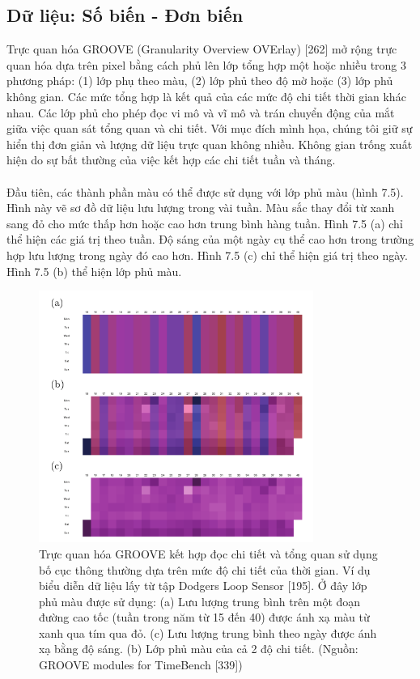 \subsection{Dữ liệu: Số biến - Đơn biến}
Trực quan hóa GROOVE (Granularity Overview OVErlay) [262] mở rộng trực quan hóa dựa trên pixel bằng cách phủ lên lớp tổng hợp một hoặc nhiều trong 3 phương pháp: (1) lớp phụ theo màu, (2) lớp phủ theo độ mờ hoặc (3) lớp phủ không gian. Các mức tổng hợp là kết quả của các mức độ chi tiết thời gian khác nhau. Các lớp phủ cho phép đọc vi mô và vĩ mô và trán chuyển động của mắt giữa việc quan sát tổng quan và chi tiết. Với mục đích mình họa, chúng tôi giữ sự hiển thị đơn giản và lượng dữ liệu trực quan không nhiều. Không gian trống xuất hiện do sự bất thường của việc kết hợp các chi tiết tuần và tháng. 
\\ \\
Đầu tiên, các thành phần màu có thể được sử dụng với lớp phủ màu (hình 7.5). Hình này vẽ sơ đồ dữ liệu lưu lượng trong vài tuần. Màu sắc thay đổi từ xanh sang đỏ cho mức thấp hơn hoặc cao hơn trung bình hàng tuần. Hình 7.5 (a) chỉ thể hiện các giá trị theo tuần. Độ sáng của một ngày cụ thể cao hơn trong trường hợp lưu lượng trong ngày đó cao hơn. Hình 7.5 (c) chỉ thể hiện giá trị theo ngày. Hình 7.5 (b) thể hiện lớp phủ màu.
\begin{figure}[H] %
    \centering %
    \includegraphics[width=0.8\textwidth]{assets/fig_7_5.png} 
    \caption{Trực quan hóa GROOVE kết hợp đọc chi tiết và tổng quan sử dụng bố cục thông thường dựa trên mức độ chi tiết của thời gian. Ví dụ biểu diễn dữ liệu lấy từ tập Dodgers Loop Sensor [195]. Ở đây lớp phủ màu được sử dụng: (a) Lưu lượng trung bình trên một đoạn đường cao tốc (tuần trong năm từ 15 đến 40) được ánh xạ màu từ xanh qua tím qua đỏ. (c) Lưu lượng trung bình theo ngày được ánh xạ bằng độ sáng. (b) Lớp phủ màu của cả 2 độ chi tiết. (Nguồn: GROOVE modules for TimeBench [339])} %
    \label{fig:f7.5}
\end{figure}
